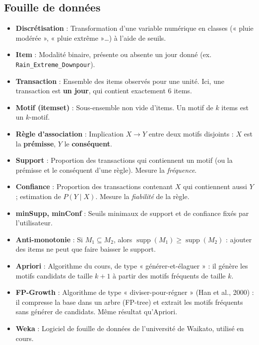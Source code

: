 \documentclass[12pt, a4paper]{article}
\newcommand{\itm}[1]{\texttt{#1}}
\begin{document}
\subsection*{Fouille de données}
\begin{itemize}[itemsep=3pt]
  \item \textbf{\color{NuitBleue}Discrétisation} : Transformation d'une variable numérique en classes (« pluie modérée », « pluie extrême »…) à l'aide de seuils.
  \item \textbf{\color{NuitBleue}Item} : Modalité binaire, présente ou absente un jour donné (ex. \itm{Rain\_Extreme\_Downpour}).
  \item \textbf{\color{NuitBleue}Transaction} : Ensemble des items observés pour une unité. Ici, une transaction est \textbf{un jour}, qui contient exactement 6 items.
  \item \textbf{\color{NuitBleue}Motif (itemset)} : Sous-ensemble non vide d'items. Un motif de $k$ items est un $k$-motif.
  \item \textbf{\color{NuitBleue}Règle d'association} : Implication $X \rightarrow Y$ entre deux motifs disjoints : $X$ est la \textbf{prémisse}, $Y$ le \textbf{conséquent}.
  \item \textbf{\color{NuitBleue}Support} : Proportion des transactions qui contiennent un motif (ou la prémisse et le conséquent d'une règle). Mesure la \emph{fréquence}.
  \item \textbf{\color{NuitBleue}Confiance} : Proportion des transactions contenant $X$ qui contiennent aussi $Y$ ; estimation de $P(Y \mid X)$. Mesure la \emph{fiabilité} de la règle.
  \item \textbf{\color{NuitBleue}minSupp, minConf} : Seuils minimaux de support et de confiance fixés par l'utilisateur.
  \item \textbf{\color{NuitBleue}Anti-monotonie} : Si $M_1 \subseteq M_2$, alors $\operatorname{supp}(M_1) \geq \operatorname{supp}(M_2)$ : ajouter des items ne peut que faire baisser le support.
  \item \textbf{\color{NuitBleue}Apriori} : Algorithme du cours, de type « générer-et-élaguer » : il génère les motifs candidats de taille $k+1$ à partir des motifs fréquents de taille $k$.
  \item \textbf{\color{NuitBleue}FP-Growth} : Algorithme de type « diviser-pour-régner » (Han et al., 2000) : il compresse la base dans un arbre (FP-tree) et extrait les motifs fréquents sans générer de candidats. Même résultat qu'Apriori.
  \item \textbf{\color{NuitBleue}Weka} : Logiciel de fouille de données de l'université de Waikato, utilisé en cours.

\end{itemize}
\end{document}

